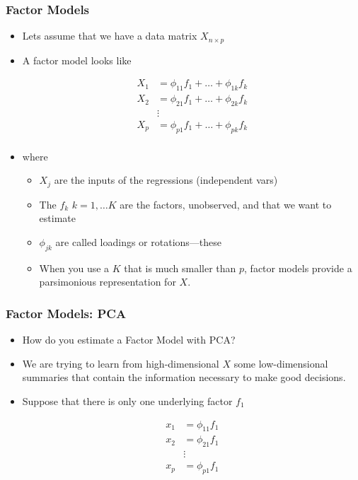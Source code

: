 \documentclass[
  shownotes,
  xcolor={svgnames},
  hyperref={colorlinks,citecolor=DarkBlue,linkcolor=DarkRed,urlcolor=DarkBlue}
  , aspectratio=169]{beamer}
\begin{document}
\begin{frame}
\frametitle{Factor Models}

\begin{itemize}
  \item Lets assume that we have a data matrix $X_{n\times p}$
  \medskip
\item A factor model looks like 

\begin{align}
X_{1}&=  \phi_{11} f_{1} + \dots + \phi_{1k} f_{k} \\ \nonumber
X_{2}&=  \phi_{21} f_{1} + \dots + \phi_{2k} f_{k} \\ \nonumber
&\vdots  \\ \nonumber
X_{p} &=  \phi_{p1} f_{1} + \dots + \phi_{pk} f_{k} \\ \nonumber
\end{align}

\item where 
  \begin{itemize}
    \footnotesize
   \item $X_{j}$ are the inputs of the regressions (independent vars)
   \medskip
   \item The $f_{k}$ $k=1,\dots K$ are the factors, unobserved, and that we want to estimate
  \medskip
   \item $\phi_{jk}$  are called loadings or rotations—these
  \medskip
   \item When you use a $K$ that is much smaller than $p$, factor models provide a parsimonious representation for $X$. 
   
  \end{itemize}


\end{itemize}
\end{frame}
\begin{frame}
\frametitle{Factor Models: PCA}

\begin{itemize}
\item How do you estimate a Factor Model with PCA?
\medskip
\item We are trying to learn from high-dimensional $X$ some low-dimensional summaries that contain the information necessary to make good decisions. 
\pause
\medskip
\item Suppose that there is only one underlying factor $f_1$
\medskip

\begin{align}
x_{1}&=  \phi_{11} f_{1} \\ \nonumber
x_{2}&=  \phi_{21} f_{1} \\ \nonumber
&\vdots  \\ \nonumber
x_{p} &=  \phi_{p1} f_{1} \\ \nonumber
\end{align}


\end{itemize}
\end{frame}
\end{document}
